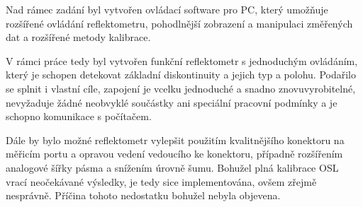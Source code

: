 Nad rámec zadání byl vytvořen ovládací software pro PC, který umožňuje rozšířené ovládání reflektometru, pohodlnější zobrazení a manipulaci změřených dat a rozšířené metody kalibrace.

V rámci práce tedy byl vytvořen funkční reflektometr s jednoduchým ovládáním, který je schopen detekovat základní diskontinuity a jejich typ a polohu. Podařilo se splnit i vlastní cíle, zapojení je vcelku jednoduché a snadno znovuvyrobitelné, nevyžaduje žádné neobvyklé součástky ani speciální pracovní podmínky a je schopno komunikace s počítačem.

Dále by bylo možné reflektometr vylepšit použitím kvalitnějšího konektoru na měřicím portu a opravou vedení vedoucího ke konektoru, případně rozšířením analogové šířky pásma a snížením úrovně šumu. Bohužel plná kalibrace OSL vrací neočekávané výsledky, je tedy sice implementována, ovšem zřejmě nesprávně. Příčina tohoto nedostatku bohužel nebyla objevena.